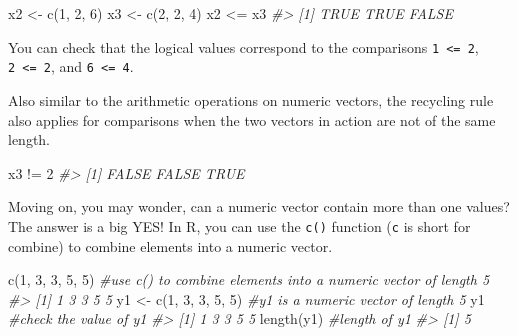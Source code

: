 \documentclass[
]{book}
\newenvironment{Shaded}{\begin{snugshade}}{\end{snugshade}}
\newcommand{\CommentTok}[1]{\textcolor[rgb]{0.56,0.35,0.01}{\textit{#1}}}
\newcommand{\DecValTok}[1]{\textcolor[rgb]{0.00,0.00,0.81}{#1}}
\newcommand{\FunctionTok}[1]{\textcolor[rgb]{0.00,0.00,0.00}{#1}}
\newcommand{\NormalTok}[1]{#1}
\newcommand{\OtherTok}[1]{\textcolor[rgb]{0.56,0.35,0.01}{#1}}
\newcommand{\SpecialCharTok}[1]{\textcolor[rgb]{0.00,0.00,0.00}{#1}}
\begin{document}
\begin{Shaded}
\begin{Highlighting}[]
\NormalTok{x2 }\OtherTok{\textless{}{-}} \FunctionTok{c}\NormalTok{(}\DecValTok{1}\NormalTok{, }\DecValTok{2}\NormalTok{, }\DecValTok{6}\NormalTok{)}
\NormalTok{x3 }\OtherTok{\textless{}{-}} \FunctionTok{c}\NormalTok{(}\DecValTok{2}\NormalTok{, }\DecValTok{2}\NormalTok{, }\DecValTok{4}\NormalTok{)}
\NormalTok{x2 }\SpecialCharTok{\textless{}=}\NormalTok{ x3}
\CommentTok{\#\textgreater{} [1]  TRUE  TRUE FALSE}
\end{Highlighting}
\end{Shaded}

You can check that the logical values correspond to the comparisons \texttt{1\ \textless{}=\ 2}, \texttt{2\ \textless{}=\ 2}, and \texttt{6\ \textless{}=\ 4}.

Also similar to the arithmetic operations on numeric vectors, the recycling rule also applies for comparisons when the two vectors in action are not of the same length.

\begin{Shaded}
\begin{Highlighting}[]
\NormalTok{x3 }\SpecialCharTok{!=} \DecValTok{2}
\CommentTok{\#\textgreater{} [1] FALSE FALSE  TRUE}
\end{Highlighting}
\end{Shaded}

Moving on, you may wonder, can a numeric vector contain more than one values? The answer is a big YES! In R, you can use the \texttt{c()} function (\texttt{c} is short for combine) to combine elements into a numeric vector.

\begin{Shaded}
\begin{Highlighting}[]
\FunctionTok{c}\NormalTok{(}\DecValTok{1}\NormalTok{, }\DecValTok{3}\NormalTok{, }\DecValTok{3}\NormalTok{, }\DecValTok{5}\NormalTok{, }\DecValTok{5}\NormalTok{)          }\CommentTok{\#use c() to combine elements into a numeric vector of length 5}
\CommentTok{\#\textgreater{} [1] 1 3 3 5 5}
\NormalTok{y1 }\OtherTok{\textless{}{-}} \FunctionTok{c}\NormalTok{(}\DecValTok{1}\NormalTok{, }\DecValTok{3}\NormalTok{, }\DecValTok{3}\NormalTok{, }\DecValTok{5}\NormalTok{, }\DecValTok{5}\NormalTok{)    }\CommentTok{\#y1 is a numeric vector of length 5}
\NormalTok{y1                        }\CommentTok{\#check the value of y1}
\CommentTok{\#\textgreater{} [1] 1 3 3 5 5}
\FunctionTok{length}\NormalTok{(y1)                }\CommentTok{\#length of y1}
\CommentTok{\#\textgreater{} [1] 5}
\end{Highlighting}
\end{Shaded}
\end{document}
